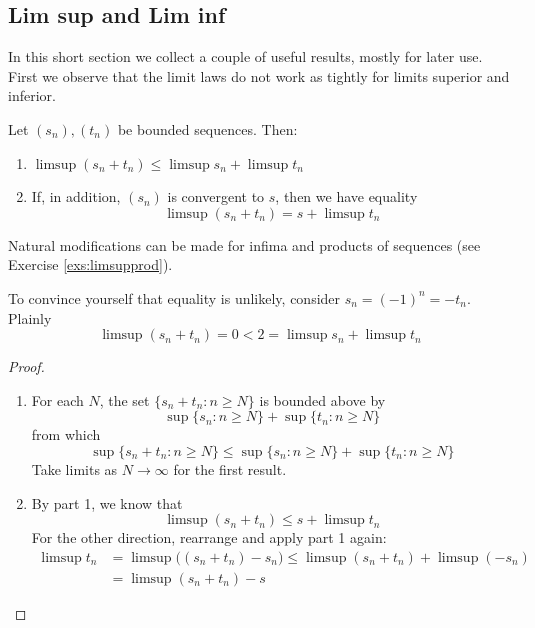 \clearpage


\subsection{Lim sup and Lim inf}

In this short section we collect a couple of useful results, mostly for later use. First we observe that the limit laws do not work as tightly for limits superior and inferior.

\begin{thm}{}{}
	Let $(s_n),(t_n)$ be bounded sequences. Then:
	\begin{enumerate}
	  \item $\limsup(s_n+t_n)\le\limsup s_n+\limsup t_n$
	  \item If, in addition, $(s_n)$ is convergent to $s$, then we have equality
		\[
			\limsup(s_n+t_n)=s+\limsup t_n
		\]
	\end{enumerate}
\end{thm}

Natural modifications can be made for infima and products of sequences (see Exercise \ref{exs:limsupprod}).

\begin{example}{}{}
	To convince yourself that equality is unlikely, consider $s_n=(-1)^n=-t_n$. Plainly
	\[
		\limsup(s_n+t_n)=0<2=\limsup s_n+\limsup t_n
	\]
\end{example}

\begin{proof}
	\begin{enumerate}
	  \item For each $N$, the set $\{s_n+t_n:n\ge N\}$ is bounded above by
		\[
			\sup\{s_n:n\ge N\}+\sup\{t_n:n\ge N\}
		\]
		from which
		\[
			\sup\{s_n+t_n:n\ge N\}\le\sup\{s_n:n\ge N\}+\sup\{t_n:n\ge N\}
		\]
		Take limits as $N\to\infty$ for the first result.\smallbreak
		
		
		\item By part 1, we know that
		\[
			\limsup(s_n+t_n)\le s+\limsup t_n
		\]
		For the other direction, rearrange and apply part 1 again:
		\begin{align*}
			\limsup t_n&=\limsup \bigl((s_n+t_n)-s_n\bigr)\le \limsup (s_n+t_n)+\limsup(-s_n)\\
			&=\limsup(s_n+t_n)-s \tag*{\qedhere}
		\end{align*}
	\end{enumerate}
\end{proof}


